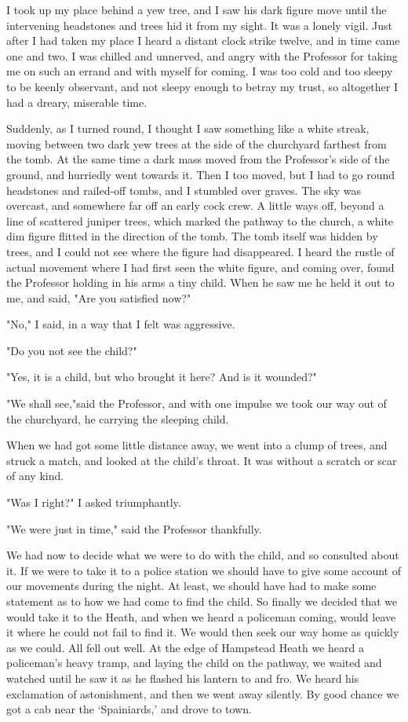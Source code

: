 I took up my place behind a yew tree, and I saw his dark figure move until the intervening headstones and trees hid it from my sight. It was a lonely vigil. Just after I had taken my place I heard a distant clock strike twelve, and in time came one and two. I was chilled and unnerved, and angry with the Professor for taking me on such an errand and with myself for coming. I was too cold and too sleepy to be keenly observant, and not sleepy enough to betray my trust, so altogether I had a dreary, miserable time. 

Suddenly, as I turned round, I thought I saw something like a white streak, moving between two dark yew trees at the side of the churchyard farthest from the tomb. At the same time a dark mass moved from the Professor's side of the ground, and hurriedly went towards it. Then I too moved, but I had to go round headstones and railed-off tombs, and I stumbled over graves. The sky was overcast, and somewhere far off an early cock crew. A little ways off, beyond a line of scattered juniper trees, which marked the pathway to the church, a white dim figure flitted in the direction of the tomb. The tomb itself was hidden by trees, and I could not see where the figure had disappeared. I heard the rustle of actual movement where I had first seen the white figure, and coming over, found the Professor holding in his arms a tiny child. When he saw me he held it out to me, and said, "Are you satisfied now?" 

"No," I said, in a way that I felt was aggressive. 

"Do you not see the child?" 

"Yes, it is a child, but who brought it here? And is it wounded?" 

"We shall see,"said the Professor, and with one impulse we took our way out of the churchyard, he carrying the sleeping child. 

When we had got some little distance away, we went into a clump of trees, and struck a match, and looked at the child's throat. It was without a scratch or scar of any kind. 

"Was I right?" I asked triumphantly. 

"We were just in time," said the Professor thankfully. 

We had now to decide what we were to do with the child, and so consulted about it. If we were to take it to a police station we should have to give some account of our movements during the night. At least, we should have had to make some statement as to how we had come to find the child. So finally we decided that we would take it to the Heath, and when we heard a policeman coming, would leave it where he could not fail to find it. We would then seek our way home as quickly as we could. All fell out well. At the edge of Hampstead Heath we heard a policeman's heavy tramp, and laying the child on the pathway, we waited and watched until he saw it as he flashed his lantern to and fro. We heard his exclamation of astonishment, and then we went away silently. By good chance we got a cab near the `Spainiards,' and drove to town. 

